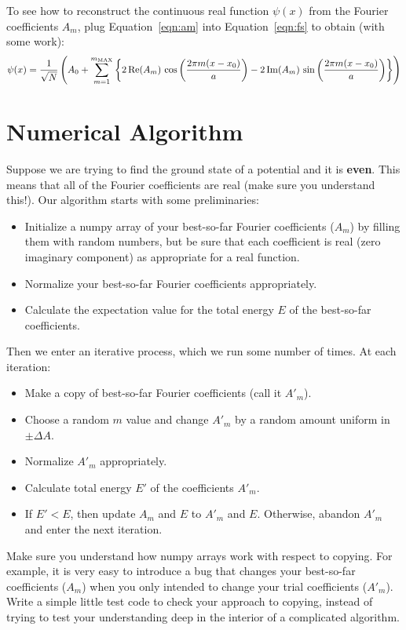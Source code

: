 \documentclass[12pt]{article}
\begin{document}
To see how to reconstruct the continuous real function $\psi(x)$ from
the Fourier coefficients $A_m$, plug Equation~\ref{eqn:am} into
Equation~\ref{eqn:fs} to obtain (with some work):
\begin{equation}
  \psi(x) = \frac{1}{\sqrt{N}} \left( A_0 + \sum_{m=1}^{m_{\rm MAX}}
  \left\{
2 \, {\rm Re}(A_m) \, \cos\left( \frac{2 \pi m (x-x_0)}{a}\right)
- 2 \, {\rm Im}(A_m) \, \sin\left( \frac{2 \pi m (x-x_0)}{a}\right) \right\} \right)
\end{equation}

\section{Numerical Algorithm}

Suppose we are trying to find the ground state of a potential and it
is {\bf even}.  This means that all of the Fourier coefficients are real (make sure you understand this!).
Our algorithm starts with some preliminaries:
\begin{itemize}
\item Initialize a numpy array of your best-so-far Fourier
  coefficients ($A_m$) by filling them with random numbers, but be sure that
  each coefficient is real (zero imaginary component) as appropriate
  for a real function.
\item Normalize your best-so-far Fourier coefficients appropriately.
\item Calculate the expectation value for the total energy $E$ of the best-so-far coefficients.
\end{itemize}
Then we enter an iterative process, which we run some number of times.  At each iteration:
\begin{itemize}
 \item Make a copy of best-so-far Fourier coefficients (call it $A'_m$).
 \item Choose a random $m$ value and change $A'_m$ by a random amount uniform in $\pm \Delta A$.
 \item Normalize $A'_m$ appropriately.
 \item Calculate total energy $E'$ of the coefficients $A'_m$.
 \item If $E' < E$, then update $A_m$ and $E$ to $A'_m$ and $E$.  Otherwise, abandon $A'_m$ and enter the next iteration.
\end{itemize}

Make sure you understand how numpy arrays work with respect to
copying.  For example, it is very easy to introduce a bug that changes
your best-so-far coefficients ($A_m$) when you only intended to change
your trial coefficients ($A'_m$).  Write a simple little test code to
check your approach to copying, instead of trying to test your
understanding deep in the interior of a complicated algorithm.
\end{document}
